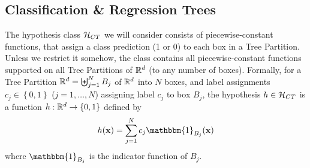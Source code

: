 \subsection{Classification \& Regression Trees}
The hypothesis class $\mathcal{H}_{CT}$  we will consider consists of piecewise-constant functions, that assign a class prediction (1 or 0) to each box in a Tree Partition. Unless we restrict it somehow, the class contains all piecewise-constant functions supported on all Tree Partitions of $\mathbb{R}^d$ (to any number of boxes). Formally, for a Tree Partition $\mathbb{R}^d=\biguplus_{j=1}^N B_j$ of $\mathbb{R}^d$ into $N$ boxes, and label assignments $c_j \in \left\{ 0,1\right\}$ ($j=1,\ldots, N$) assigning label $c_j$ to box $B_j$, the hypothesis $h\in\mathcal{H}_{CT}$ is a function $h:\mathbb{R}^d\to\left\{ 0,1 \right\}$ defined by $$ h(\x) = \sum_{j=1}^N c_j \mathbbm{1}_{B_j}(\x) $$ where $\mathbbm{1}_{B_j}$ is the indicator function of $B_j$. 

